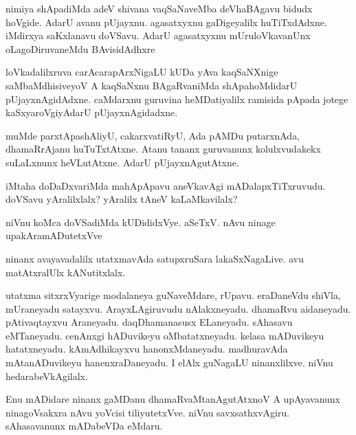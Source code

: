 \documentclass{article}
\begin{document}
\begin{mn}
nimiya shApadiMda  adeV shivana vaqSaNaveMba deVhaBAgavu  bidudx hoVgide.  
AdarU avanu pUjayxnu.  agasatxyxnu gaDigeyalilx huTiTxdAdxne. iMdirxya saKxlanavu 
doVSavu.  AdarU agasatxyxnu  mUruloVkavanUnx  oLagoDiruvaneMdu  BAvisidAdhxre
\end{mn}

\begin{mn}
loVkadalilxruva carAcarapArxNigaLU  kUDa yAva kaqSaNXnige saMbaMdhisiveyoV A  
kaqSaNxnu  BAgaRvaniMda  shApahoMdidarU  pUjayxnAgidAdxne.  caMdarxnu guruvina  
heMDatiyalilx ramisida pApada jotege kaSxyaroVgiyAdarU pUjayxnAgidadxne.  
\end{mn}

\begin{mn}
muMde parxtApashAliyU, cakarxvatiRyU, Ada pAMDu putarxnAda, dhamaRrAjanu huTuTxtAtxne. 
Atanu tananx guruvanunx kolulxvudakekx  suLaLxnunx heVLutAtxne.  AdarU pUjayxnAgutAtxne.
\end{mn}

\begin{mn}
iMtaha doDaDxvariMda mahApApavu aneVkavAgi mADalapxTiTxruvudu. doVSavu yAralilxlalx?  
yAralilx tAneV kaLaMkavilalx?
\end{mn}

\begin{mn}
niVnu koMca doVSadiMda kUDididxVye.  aSeTxV.  nAvu ninage upakAramADutetxVve
\end{mn}

\begin{mn}
ninanx avayavadalilx utatxmavAda satupxruSara lakaSxNagaLive. avu matAtxralUlx kANutitxlalx.
\end{mn}

\begin{mn}
utatxma sitxrxVyarige modalaneya guNaveMdare, rUpavu. eraDaneVdu shiVla, mUraneyadu satayxvu. 
ArayxLAgiruvudu nAlakxneyadu. dhamaRvu  aidaneyadu.  pAtivaqtayxvu Araneyadu. 
daqDhamanasusx  ELaneyadu. sAhasavu eMTaneyadu.  cenAnxgi hADuvikeyu oMbatatxneyadu. 
kelasa mADuvikeyu hatatxneyadu. kAmAdhikayxvu hanonxMdaneyadu. madhuravAda 
mAtanADuvikeyu hanenxraDaneyadu.  I elAlx guNagaLU ninanxlilxve. niVnu hedarabeVkAgilalx.
\end{mn}

\begin{mn}
Enu mADidare ninanx gaMDanu dhamaRvaMtanAgutAtxnoV A upAyavanunx ninagoVsakxra  nAvu 
yoVcisi tiliyutetxVve.  niVnu savxsathxvAgiru.  sAhasavanunx mADabeVDa eMdaru.
\end{mn}
\end{document}
